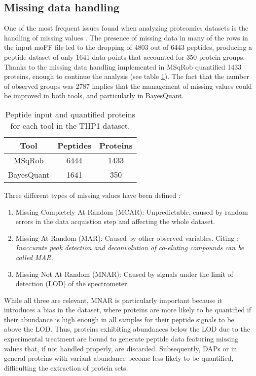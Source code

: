 \subsection{Missing data handling}

One of the most frequent issues found when analyzing proteomics datasets is the handling of missing values \cite{Lazar2016}. The presence of missing data in many of the rows in the input moFF file led to the dropping of 4803 out of 6443 peptides, producing a peptide dataset of only 1641 data points that accounted for 350 protein groups. Thanks to the missing data handling implemented in MSqRob quantified 1433 proteins, enough to continue the analysis (see table \ref{tab:balance}). The fact that the number of observed groups was 2787 implies that the management of missing values could be improved in both tools, and particularly in BayesQuant.

\begin{table}[!h]
\centering
\begin{tabular}{|c|c|c|}
\hline 
Tool & Peptides & Proteins \\ 
\hline 
MSqRob & 6444 & 1433 \\ 
\hline 
BayesQuant & 1641 & 350 \\ 
\hline 
\end{tabular} 
\caption{Peptide input and quantified proteins for each tool in the THP1 dataset.}
\label{tab:balance}
\end{table}

Three different types of missing values have been defined \cite{Wei2018}:

\begin{enumerate}

\item Missing Completely At Random (MCAR): Unpredictable, caused by random errors in the data acquistion step and affecting the whole dataset.

\item Missing At Random (MAR): Caused by other observed variables. Citing \cite{Wei2018}: \textit{ Inaccurate peak detection and deconvolution of co-eluting compounds can be called MAR}.

\item Missing Not At Random (\ac{MNAR}): Caused by signals under the limit of detection (\ac{LOD}) of the spectrometer.

\end{enumerate}

While all three are relevant, \ac{MNAR} is particularly important because it introduces a bias in the dataset, where proteins are more likely to be quantified if their abundance is high enough in all samples for their peptide signals to be above the \ac{LOD}. Thus, proteins exhibiting abundances below the \ac{LOD} due to the experimental treatment are bound to generate peptide data featuring missing values that, if not handled properly, are discarded. Subsequently, \ac{DAP}s or in general proteins with variant abundance become less likely to be quantified, difficulting the extraction of protein sets.

